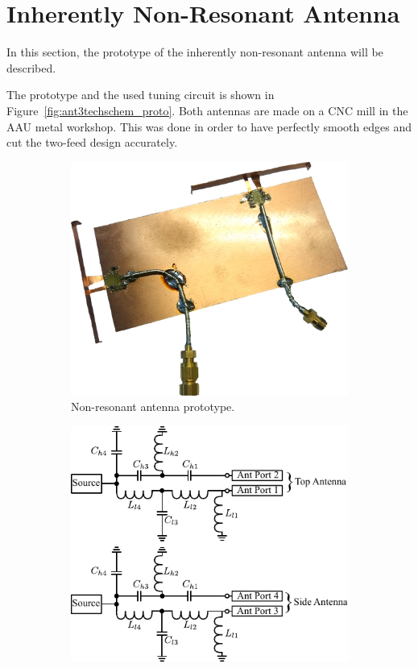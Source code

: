 \section{Inherently Non-Resonant Antenna}
In this section, the prototype of the inherently non-resonant antenna will be described.

The prototype and the used tuning circuit is shown in Figure~\ref{fig:ant3techschem_proto}. Both antennas are made on a CNC mill in the AAU metal workshop. This was done in order to have perfectly smooth edges and cut the two-feed design accurately.   

\begin{figure}[htbp]
    \begin{subfigure}[b]{0.49\linewidth}
        \centering
        \includegraphics[scale=0.1]{img/tech_sol/nonresonant/prototype/3d_figure.jpg}
        \caption{Non-resonant antenna prototype.}
        \label{fig:nonresonant_proto}
    \end{subfigure}
    \hfill
    \begin{subfigure}[b]{0.49\linewidth}
        \centering
        \includegraphics{img/tech_sol/nonresonant/schematic_tuning}\\[0cm]

\end{subfigure}
\end{figure}
